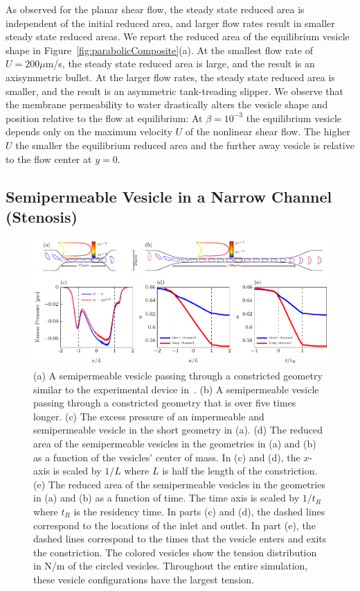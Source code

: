 \documentclass[9pt,twocolumn,twoside,lineno]{pnas-new}
\newif\ifTikz
\begin{document}
As observed for the planar shear flow, the steady state reduced area is
independent of the initial reduced area, and larger flow rates result in
smaller steady state reduced areas. We report the reduced area of the
equilibrium vesicle shape in Figure~\ref{fig:parabolicComposite}(a). At
the smallest flow rate of $U= 200 \mu$m/s, the steady state reduced
area is large, and the result is an axisymmetric bullet. At the larger
flow rates, the steady state reduced area is smaller, and the result is
an asymmetric tank-treading slipper. We observe that the membrane
permeability to water drastically alters the vesicle shape and position
relative to the flow at equilibrium: At $\beta=10^{-3}$ the equilibrium
vesicle depends only on the maximum velocity $U$ of the nonlinear shear
flow. The higher $U$ the smaller the equilibrium reduced area and the
further away vesicle is relative to the flow center at $y=0$. 
 
\subsection*{Semipermeable Vesicle in a Narrow Channel (Stenosis)}
 \begin{figure}[htp]
  \centering
  \ifTikz
  
  \else
  \includegraphics{figures/stenosisComposite.pdf}
  \fi
  \caption{\label{fig:stenosisComposite} (a) A semipermeable vesicle
  passing through a constricted geometry similar to the experimental
  device in~\cite{abk-fai-sto2006}. (b) A semipermeable vesicle passing
  through a constricted geometry that is over five times longer. (c)
  The excess pressure of an impermeable and semipermeable vesicle in the
  short geometry in (a). (d) The reduced area of the semipermeable
   vesicles in the geometries in (a) and (b) as a function of the
   vesicles' center of mass. In (c) and (d), the $x$-axis is scaled by
   $1/L$ where $L$ is half the length of the constriction. (e) The
   reduced area of the semipermeable vesicles in the geometries in (a)
   and (b) as a function of time. The time axis is scaled by $1/t_R$
   where $t_R$ is the residency time. In parts (c) and (d), the dashed
   lines correspond to the locations of the inlet and outlet. In part
   (e), the dashed lines correspond to the times that the vesicle enters
   and exits the constriction. The colored vesicles show the tension
   distribution in N/m of the circled vesicles. Throughout the entire
   simulation, these vesicle configurations have the largest tension.
   }
\end{figure}
\end{document}
